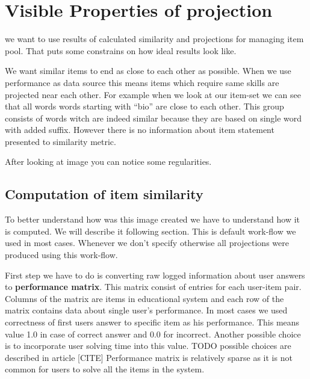 \documentclass[
  digital, %
  table,   %
  nolof,     %
  nolot,     %
  nocover
]{fithesis3}
\begin{document}
\section{Visible Properties of
projection}\label{visible-properties-of-projection}



we want to use results of calculated similarity and projections for
managing item pool. That puts some constrains on how ideal results look
like.

We want similar items to end as close to each other as possible. When we use performance as data source this means items which require same skills are projected near each other. For example when we look at our item-set we can see that all words words starting with ``bio'' are close to each other. This group consists of words witch are indeed similar because they are based on
single word with added suffix. However there is no information about item statement presented to similarity metric.



After looking at image you can notice some regularities.

\subsection{Computation of item
similarity}\label{computation-of-item-similarity}


To better understand how was this image created we have to understand
how it is computed. We will describe it following section. This is
default work-flow we used in most cases. Whenever we don't specify
otherwise all projections were produced using this work-flow.


First step we have to do is converting raw logged information about
user answers to \textbf{performance matrix}. This matrix consist of entries for
each user-item pair. Columns of the matrix are items in educational
system and each row of the matrix contains data about single user's
performance. In most cases we used correctness of first users answer
to specific item as his performance. This means value 1.0 in case of
correct answer and 0.0 for incorrect. Another possible choice is to
incorporate user solving time into this value. TODO possible choices
are described in article [CITE] Performance matrix is relatively
sparse as it is not common for users to solve all the items in the
system.
\end{document}
